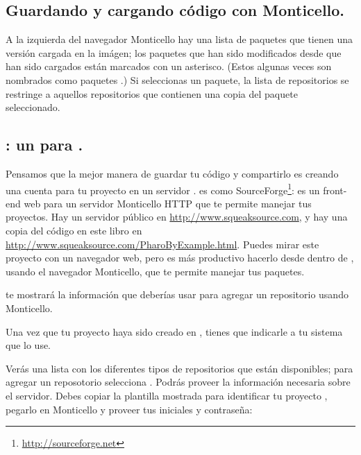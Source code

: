 \documentclass[a4paper,10pt,twoside]{book}
\begin{document}
\subsection{Guardando y cargando c\'odigo con Monticello.}

A la izquierda del navegador Monticello hay una lista de paquetes que tienen una versi\'on cargada en la im\'agen; los paquetes que han sido modificados desde que han sido cargados est\'an marcados con un asterisco. (Estos algunas veces son nombrados como paquetes .) Si seleccionas un paquete, la lista de repositorios se restringe a aquellos repositorios que contienen una copia del paquete seleccionado.


\subsection{\ind{\sqsrc}: un  para \pharo.} 

Pensamos que la mejor manera de guardar tu c\'odigo y compartirlo es creando una cuenta para tu proyecto en un servidor \sqsrc. \sqsrc es como SourceForge\footnote{\url{http://sourceforge.net}}: es un front-end web para un servidor Monticello HTTP que te permite manejar tus proyectos.
Hay un servidor \sqsrc p\'ublico en \url{http://www.squeaksource.com}, y hay una copia del c\'odigo en este libro en \url{http://www.squeaksource.com/PharoByExample.html}. Puedes mirar este proyecto con un navegador web, pero es m\'as productivo hacerlo desde dentro de \pharo, usando el navegador Monticello, que te permite manejar tus paquetes.

\sqsrc te mostrar\'a la informaci\'on que deber\'ias usar para agregar un repositorio usando Monticello.

Una vez que tu proyecto haya sido creado en \sqsrc, tienes que indicarle a tu sistema \pharo que lo use. 

Ver\'as una lista con los diferentes tipos de repositorios que est\'an disponibles; para agregar un reposotorio \sqsrc selecciona . Podr\'as proveer la informaci\'on necesaria sobre el servidor. 
Debes copiar la plantilla mostrada para identificar tu proyecto \sqsrc, pegarlo en Monticello y proveer tus iniciales y contrase\~na:
\end{document}
